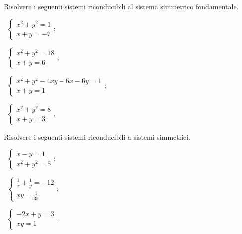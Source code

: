 \begin{esercizio}[\Ast]
\label{ese:6.24}
Risolvere i seguenti sistemi riconducibili al sistema simmetrico fondamentale.
\begin{multicols}{2}
 \begin{enumeratea}
 \item~$\left\{\begin{array}{l}x^2+y^2=1\\x+y=-7\end{array}\right.$;
 \item~$\left\{\begin{array}{l}x^2+y^2=18\\x+y=6 \end{array}\right.$;
 \item~$\left\{\begin{array}{l}x^2+y^2-4xy-6x-6y=1\\x+y=1 \end{array}\right.$;
 \item~$\left\{\begin{array}{l}x^2+y^2=8\\x+y=3\end{array}\right.$.
 \end{enumeratea}
 \end{multicols}
\end{esercizio}
\pagebreak
\begin{esercizio}[\Ast]
\label{ese:6.25}
Risolvere i seguenti sistemi riconducibili a sistemi simmetrici.
\begin{multicols}{3}
 \begin{enumeratea}
 \item~$\left\{\begin{array}{l}{x-y=1}\\{x^2+y^2=5}\end{array}\right.$;
 \item~$\left\{\begin{array}{l}{\frac 1 x+\frac 1 y=-12}\\{{xy}=\frac 1{35}}\end{array}\right.$;
 \item~$\left\{\begin{array}{l}{-2x+y=3}\\{{xy}=1}\end{array}\right.$.
 \end{enumeratea}
 \end{multicols}
\end{esercizio}


